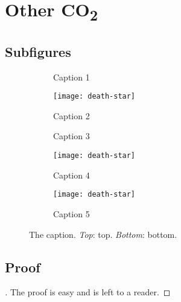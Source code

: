\documentclass[a4paper,11pt]{article}
\begin{document}
  \section{Other CO\texorpdfstring{\textsubscript{2}}{2}}
  \subsection*{Subfigures}
  \begin{figure}[htb]
    \centering
    \begin{subfigure}[b]{.475\textwidth}
      \caption{Caption 1}
      \label{fig:1}
    \end{subfigure}
    \hfill
    \begin{subfigure}[b]{.475\textwidth}
      \texttt{[image: death-star]}
      \caption{Caption 2}
      \label{fig:2}
    \end{subfigure}
    \begin{subfigure}[b]{.3\textwidth}
      \caption{Caption 3}
      \label{fig:3}
    \end{subfigure}
    \hfill
    \begin{subfigure}[b]{.3\textwidth}
      \texttt{[image: death-star]}
      \caption{Caption 4}
      \label{fig:4}
    \end{subfigure}
    \hfill
    \begin{subfigure}[b]{.3\textwidth}
      \texttt{[image: death-star]}
      \caption{Caption 5}
      \label{fig:5}
    \end{subfigure}
    \caption{The caption. \emph{Top}: top. \emph{Bottom}: bottom.}
    \label{fig:subfigures}
  \end{figure}

  \subsection*{Proof}
    \begin{proof}[\unskip\nopunct]
      The proof is easy and is left to a reader.
    \end{proof}
\end{document}
